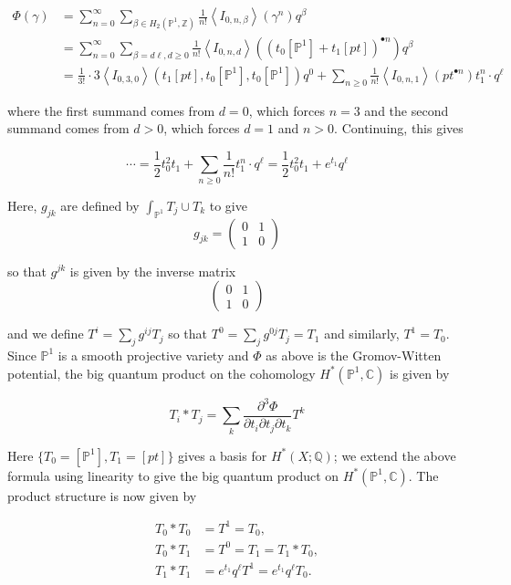 \documentclass{amsart}
\newcommand{\PP}{\mathbb{P}}\newcommand{\A}{\mathbb{A}}\newcommand{\Z}{\mathbb{Z}}\newcommand{\C}{\mathbb{C}}\newcommand{\N}{\mathbb{N}}\newcommand{\T}{\mathbb{T}}
\newcommand{\Q}{\mathbb{Q}}
\begin{document}
\begin{align}\label{eqn: GWPotP1}
\Phi(\gamma) &= \sum_{n=0}^\infty \sum_{\beta\in H_2(\PP^1,\Z)}\frac{1}{n!}\left<I_{0,n,\beta}\right>(\gamma^n)q^\beta\\
&= \sum_{n=0}^\infty \sum_{\beta = d\ell, d\geq 0} \frac{1}{n!} \left< I_{0,n,d}\right>((t_0[\PP^1] + t_1[pt])^{\bullet n}) q^\beta \\
&= \frac{1}{3!} \cdot 3 \left<I_{0,3,0}\right> (t_1[pt],t_0[\PP^1],t_0[\PP^1])q^0 + \sum_{n\geq 0} \frac{1}{n!} \left< I_{0,n,1}\right>(pt^{\bullet n})t_1^n \cdot q^\ell \end{align}

where the first summand comes from $d=0$, which forces $n=3$ and the second summand comes from $d>0$, which forces $d=1$ and $n>0$. Continuing, this gives

\[
    \cdots = \frac{1}{2} t_0^2t_1 + \sum_{n\geq 0} \frac{1}{n!} t_1^n \cdot q^\ell = \frac{1}{2} t_0^2 t_1 + e^{t_1} q^\ell
\]


Here, $g_{jk}$ are defined by $\int_{\PP^1} T_j \cup T_k$ to give \[ g_{jk} = \left( \begin{matrix} 0 & 1 \\ 1 & 0 \end{matrix} \right) \] 

so that $g^{jk}$ is given by the inverse matrix \[ \left( \begin{matrix} 0 & 1 \\ 1 & 0 \end{matrix}\right) \]


and we define $T^i = \sum_j g^{ij}T_j$ so that $T^0 = \sum_j g^{0j} T_j = T_1$ and similarly, $T^1 = T_0$. Since $\PP^1$ is a smooth projective variety and $\Phi$ as above is the Gromov-Witten potential, the big quantum product on the cohomology $H^*(\PP^1,\C)$ is given by 

\[ T_i * T_j = \sum_k \frac{ \partial^3 \Phi}{\partial t_i \partial t_j \partial t_k} T^k\]


Here $\{T_0 = [\PP^1], T_1 = [pt]\}$ gives a basis for $H^*(X;\Q)$; we extend the above formula using linearity to give the big quantum product on $H^*(\PP^1,\C)$. The product structure is now given by

\begin{align*}
    T_0*T_0 &= T^1=T_0,\\
    T_0*T_1 &= T^0= T_1=T_1*T_0,\\
    T_1 * T_1 &= e^{t_1}q^\ell T^1 = e^{t_1}q^\ell T_0. 
\end{align*}
\end{document}
